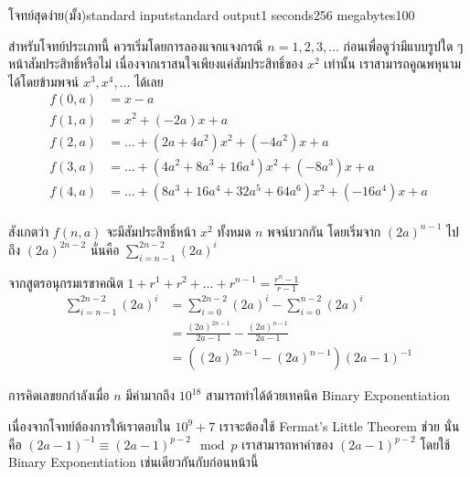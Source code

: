 \documentclass[11pt,a4paper]{article}
\begin{document}
\begin{problem}{โจทย์สุดง่าย(มั้ง)}{standard input}{standard output}{1 seconds}{256 megabytes}{100}

สำหรับโจทย์ประเภทนี้ ควรเริ่มโดยการลองแจกแจงกรณี $n=1,2,3,\dots$ ก่อนเพื่อดูว่ามีแบบรูปใด ๆ หน้าสัมประสิทธิ์หรือไม่ เนื่องจากเราสนใจเพียงแค่สัมประสิทธิ์ของ $x^2$ เท่านั้น เราสามารถคูณพหุนามได้โดยข้ามพจน์ $x^3, x^4, \dots$ ได้เลย
\begin{align*}
f(0,a) &= x-a \\
f(1,a) &= x^2 + (-2a)x + a \\
f(2,a) &= \dots + (2a+4a^2)x^2 + (-4a^2)x + a \\
f(3,a) &= \dots + (4a^2+8a^3+16a^4)x^2 + (-8a^3)x + a \\
f(4,a) &= \dots + (8a^3+16a^4+32a^5+64a^6)x^2 + (-16a^4)x + a \\
\end{align*}

สังเกตว่า $f(n,a)$ จะมีสัมประสิทธิ์หน้า $x^2$ ทั้งหมด $n$ พจน์บวกกัน โดยเริ่มจาก $(2a)^{n-1}$ ไปถึง $(2a)^{2n-2}$ นั่นคือ $\sum_{i=n-1}^{2n-2} (2a)^i$

จากสูตรอนุกรมเรขาคณิต $1+r^1+r^2+\dots+r^{n-1} = \frac{r^n-1}{r-1}$
\begin{align*}
\sum_{i=n-1}^{2n-2} (2a)^i &= \sum_{i=0}^{2n-2} (2a)^i - \sum_{i=0}^{n-2} (2a)^i \\
&= \frac{(2a)^{2n-1}}{2a-1} - \frac{(2a)^{n-1}}{2a-1} \\
&= \left((2a)^{2n-1} - (2a)^{n-1}\right)\left(2a-1\right)^{-1}
\end{align*}

การคิดเลขยกกำลังเมื่อ $n$ มีค่ามากถึง $10^{18}$ สามารถทำได้ด้วยเทคนิค Binary Exponentiation

เนื่องจากโจทย์ต้องการให้เราตอบใน $10^9+7$ เราจะต้องใช้ Fermat's Little Theorem ช่วย นั่นคือ $(2a-1)^{-1} \equiv (2a-1)^{p-2} \mod p$ เราสามารถหาค่าของ $(2a-1)^{p-2}$ โดยใช้ Binary Exponentiation เช่นเดียวกันกับก่อนหน้านี้

\end{problem}

\pagebreak
\end{document}
